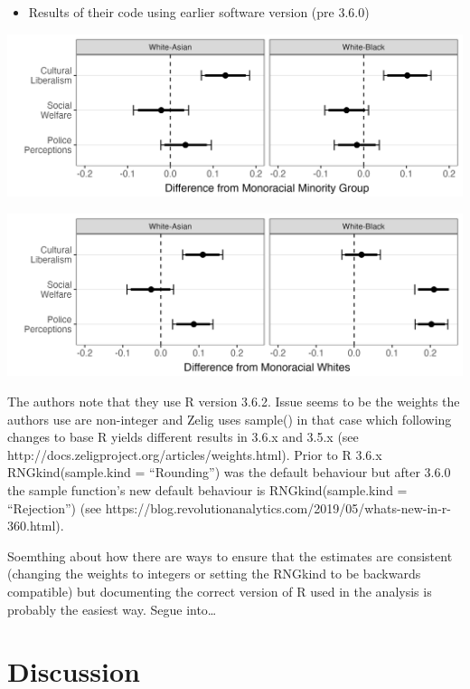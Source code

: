 \documentclass[
  letterpaper,
  DIV=11,
  numbers=noendperiod]{scrartcl}
\providecommand{\tightlist}{%
  \setlength{\itemsep}{0pt}\setlength{\parskip}{0pt}}\usepackage{longtable,booktabs,array}
\begin{document}
\begin{itemize}
\tightlist
\item
  Results of their code using earlier software version (pre 3.6.0)
\end{itemize}

\includegraphics[width=1\textwidth,height=\textheight]{./figures/figure1_prechange.png}

\includegraphics[width=1\textwidth,height=\textheight]{./figures/figure2_prechange.png}

The authors note that they use R version 3.6.2. Issue seems to be the
weights the authors use are non-integer and Zelig uses sample() in that
case which following changes to base R yields different results in 3.6.x
and 3.5.x (see http://docs.zeligproject.org/articles/weights.html).
Prior to R 3.6.x RNGkind(sample.kind = ``Rounding'') was the default
behaviour but after 3.6.0 the sample function's new default behaviour is
RNGkind(sample.kind = ``Rejection'') (see
https://blog.revolutionanalytics.com/2019/05/whats-new-in-r-360.html).

Soemthing about how there are ways to ensure that the estimates are
consistent (changing the weights to integers or setting the RNGkind to
be backwards compatible) but documenting the correct version of R used
in the analysis is probably the easiest way. Segue into\ldots{}

\newpage

\hypertarget{discussion}{%
\section{Discussion}\label{discussion}}
\end{document}
